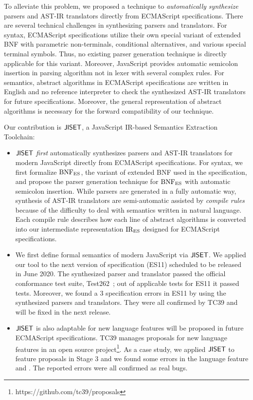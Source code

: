 To alleviate this problem, we proposed a technique to \textit{automatically
synthesize} parsers and AST-IR translators directly from ECMAScript
specifications. There are several technical challenges in synthesizing parsers
and translators. For syntax, ECMAScript specifications utilize their own special
variant of extended BNF with parametric non-terminals, conditional
alternatives, and various special terminal symbols. Thus, no existing parser
generation technique is directly applicable for this variant. Moreover,
JavaScript provides automatic semicolon insertion in parsing algorithm not in
lexer with several complex rules. For semantics, abstract algorithms in
ECMAScript specifications are written in English and no reference interpreter to
check the synthesized AST-IR translators for future specifications.  Moreover,
the general representation of abstract algorithms is necessary for the forward
compatibility of our technique.

Our contribution is \( \text{\sf JISET} \), a JavaScript IR-based Semantics Extraction
Toolchain:
\begin{itemize}[leftmargin=0.5cm]
  \item \( \text{\sf JISET} \) \textit{first} automatically synthesizes parsers and AST-IR
    translators for modern JavaScript directly from ECMAScript specifications.
    For syntax, we first formalize \( \text{BNF}_{\text{ES}} \), the variant of extended BNF
    used in the specification, and propose the parser generation technique for
    \( \text{BNF}_{\text{ES}} \) with automatic semicolon insertion.  While parsers are
    generated in a fully automatic way, synthesis of AST-IR translators are
    semi-automatic assisted by \textit{compile rules} because of the difficulty
    to deal with semantics written in natural language. Each compile rule
    describes how each line of abstract algorithms is converted into our
    intermediate representation \( \text{IR}_\text{ES} \) designed for ECMAScript
    specifications.
  \item We first define formal semantics of modern JavaScript via \( \text{\sf JISET} \).
    We applied our tool to the next version of specification (ES11) scheduled to
    be released in June 2020.  The synthesized parser and translator passed the
    official conformance test suite, Test262~\cite{test262}; out of
     applicable tests for ES11 it passed 
    tests.  Moreover, we found a 3 specification errors in ES11 by
    using the synthesized parsers and translators.  They were all confirmed by
    TC39 and will be fixed in the next release.
  \item \( \text{\sf JISET} \) is also adaptable for new language features will be proposed
    in future ECMAScript specifications.  TC39 manages proposals for new
    language features in an open source
    project\footnote{https://github.com/tc39/proposals}. As a case study, we
    applied \( \text{\sf JISET} \) to feature proposals in Stage 3 and we found some errors
    in the language feature  and . The reported errors
    were all confirmed as real bugs.
\end{itemize}
